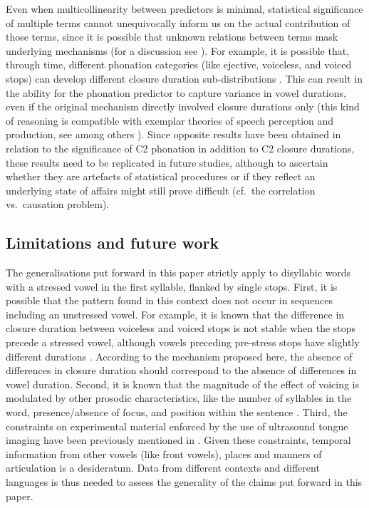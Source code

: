 \documentclass[charis]{glossa}
\begin{document}
Even when multicollinearity between predictors is minimal, statistical
significance of multiple terms cannot unequivocally inform us on the
actual contribution of those terms, since it is possible that unknown
relations between terms mask underlying mechanisms (for a discussion see
\citealt{mcelreath2015}). For example, it is possible that, through
time, different phonation categories (like ejective, voiceless, and
voiced stops) can develop different closure duration sub-distributions
\citep{soskuthy2013}. This can result in the ability for the phonation
predictor to capture variance in vowel durations, even if the original
mechanism directly involved closure durations only (this kind of
reasoning is compatible with exemplar theories of speech perception and
production, see among others
\citealt{johnson1997, soskuthy2018, ambridge2018, todd2018}). Since
opposite results have been obtained in relation to the significance of
C2 phonation in addition to C2 closure durations, these results need to
be replicated in future studies, although to ascertain whether they are
artefacts of statistical procedures or if they reflect an underlying
state of affairs might still prove difficult (cf.~the correlation
vs.~causation problem).

\hypertarget{limitations-and-future-work}{%
\subsection{Limitations and future
work}\label{limitations-and-future-work}}

The generalisations put forward in this paper strictly apply to
disyllabic words with a stressed vowel in the first syllable, flanked by
single stops. First, it is possible that the pattern found in this
context does not occur in sequences including an unstressed vowel. For
example, it is known that the difference in closure duration between
voiceless and voiced stops is not stable when the stops precede a
stressed vowel, although vowels preceding pre-stress stops have slightly
different durations \citep{davis1989}. According to the mechanism
proposed here, the absence of differences in closure duration should
correspond to the absence of differences in vowel duration. Second, it
is known that the magnitude of the effect of voicing is modulated by
other prosodic characteristics, like the number of syllables in the
word, presence/absence of focus, and position within the sentence
\citep{sharf1962, klatt1973, laeufer1992, de-jong2004}. Third, the
constraints on experimental material enforced by the use of ultrasound
tongue imaging have been previously mentioned in .
Given these constraints, temporal information from other vowels (like
front vowels), places and manners of articulation is a desideratum. Data
from different contexts and different languages is thus needed to assess
the generality of the claims put forward in this paper.
\end{document}
